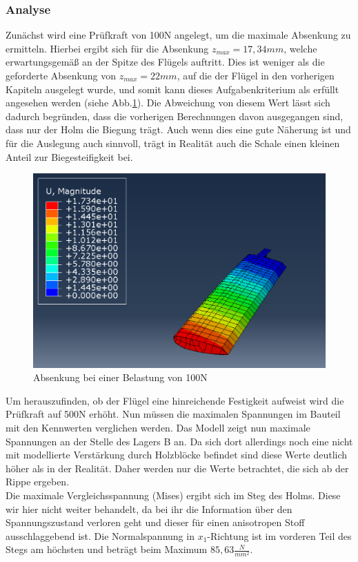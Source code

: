 \subsubsection{Analyse}
Zunächst wird eine Prüfkraft von 100N angelegt, um die maximale Absenkung zu ermitteln. Hierbei ergibt sich für die Absenkung $z_{max}=17,34mm$, welche erwartungsgemäß an der Spitze des Flügels auftritt. Dies ist weniger als die geforderte Absenkung von $z_{max}=22mm$, auf die der Flügel in den vorherigen Kapiteln ausgelegt wurde, und somit kann dieses Aufgabenkriterium als erfüllt angesehen werden (siehe Abb.\ref{Absenkung}). Die Abweichung von diesem Wert lässt sich dadurch begründen, dass die vorherigen Berechnungen davon ausgegangen sind, dass nur der Holm die Biegung trägt. Auch wenn dies eine gute Näherung ist und für die Auslegung auch sinnvoll, trägt in Realität auch die Schale einen kleinen Anteil zur Biegesteifigkeit bei.
\begin{figure}[h]
 \centering
 \includegraphics[scale=0.4]{Bilder/Absenkung_100N}
 \caption{Absenkung bei einer Belastung von 100N}
 \label{Absenkung}
\end{figure}
\newpage
\noindent
Um herauszufinden, ob der Flügel eine hinreichende Festigkeit aufweist wird die Prüfkraft auf 500N erhöht. Nun müssen die maximalen Spannungen im Bauteil mit den Kennwerten verglichen werden. Das Modell zeigt nun maximale Spannungen an der Stelle des Lagers B an. Da sich dort allerdings noch eine nicht mit modellierte Verstärkung durch Holzblöcke befindet sind diese Werte deutlich höher als in der Realität. Daher werden nur die Werte betrachtet, die sich ab der Rippe ergeben.\\
Die maximale Vergleichsspannung (Mises) ergibt sich im Steg des Holms. Diese wir hier nicht weiter behandelt, da bei ihr die Information über den Spannungszustand verloren geht und dieser für einen anisotropen Stoff ausschlaggebend ist. Die Normalspannung in $x_{1}$-Richtung ist im vorderen Teil des Stegs am höchsten und beträgt beim Maximum $85,63\frac{N}{mm^2}$.\\
